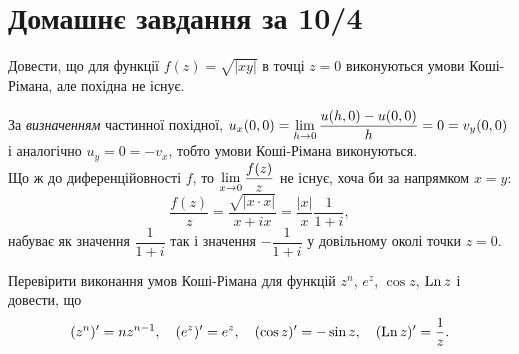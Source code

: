 \setcounter{section}{5}

\section{Домашнє завдання за 10/4}

\begin{problem}[Волковиський, 139]
    Довести, що для функції $f(z)=\sqrt{|xy|}$ в точці $z = 0$ виконуються умови Коші-Рімана, але похідна не існує.
\end{problem}

\begin{solution}
    За \textit{визначенням} частинної похідної, $u_x(0, 0) = \displaystyle\lim\limits_{h \to 0} \dfrac{u(h, 0) - u(0, 0)}{h} = 0 = v_y(0, 0)$ і аналогічно $u_y = 0 = - v_x$, тобто умови Коші-Рімана виконуються. \\
    
    Що ж до диференційовності $f$, то $\displaystyle\lim\limits_{x \to 0} \dfrac {f(z)}{z}$ не існує, хоча би за напрямком $x = y$: 
    \[ \dfrac{f(z)}{z} = \dfrac{\sqrt{|x \cdot x|}}{x + ix} = \dfrac{|x|}{x} \dfrac{1}{1 + i}, \]
    набуває як значення $\dfrac{1}{1 + i}$ так і значення $-\dfrac{1}{1 + i}$ у довільному околі точки $z = 0$.
\end{solution}

\begin{problem}[Волковиський, 131]
    Перевірити виконання умов Коші-Рімана для функцій $z^n$, $e^z$, $\cos z$, $\operatorname{Ln} z$ і довести, що 
    \[ (z^n)' = n z^{n-1}, \quad (e^z)' = e^z, \quad (\cos z)' = - \sin z, \quad (\operatorname{Ln} z)' = \dfrac1z. \]
\end{problem}

